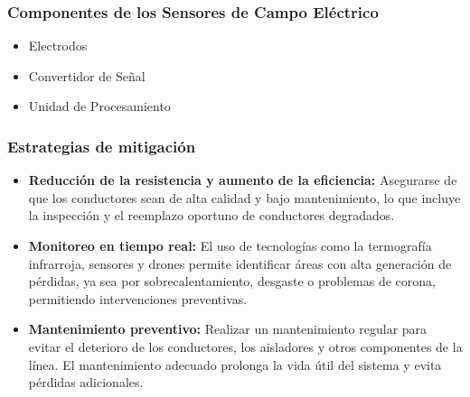         \subsubsection*{Componentes de los Sensores de Campo Eléctrico}

            \begin{itemize}
                \item Electrodos
                \item Convertidor de Señal
                \item Unidad de Procesamiento
            \end{itemize}

        \subsubsection{Estrategias de mitigación}

            \begin{itemize}
                \item \textbf{Reducción de la resistencia y aumento de la eficiencia: } Asegurarse de que los conductores sean de alta calidad y bajo mantenimiento, lo que incluye la inspección y el reemplazo oportuno de conductores degradados.

                \item \textbf{Monitoreo en tiempo real:  } El uso de tecnologías como la termografía infrarroja, sensores y drones permite identificar áreas con alta generación de pérdidas, ya sea por sobrecalentamiento, desgaste o problemas de corona, permitiendo intervenciones preventivas.

                \item \textbf{Mantenimiento preventivo: }   Realizar un mantenimiento regular para evitar el deterioro de los conductores, los aisladores y otros componentes de la línea. El mantenimiento adecuado prolonga la vida útil del sistema y evita pérdidas adicionales.
            \end{itemize}
            


\newpage